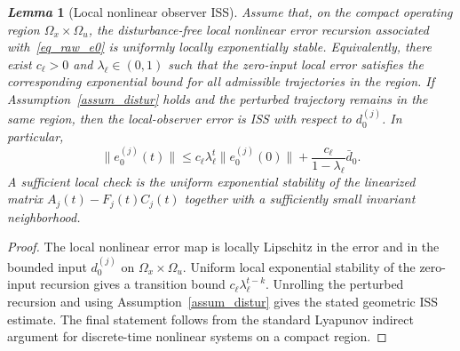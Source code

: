 \documentclass[journal,twoside]{IEEEtran}
\newtheorem{lemma}{\it Lemma}%
\begin{document}
\begin{lemma}[Local nonlinear observer ISS]\label{lem_local_iss}
Assume that, on the compact operating region $\Omega_x\times\Omega_u$, the disturbance-free local nonlinear error recursion associated with~\eqref{eq_raw_e0} is uniformly locally exponentially stable. Equivalently, there exist $c_{\ell}>0$ and $\lambda_{\ell}\in(0,1)$ such that the zero-input local error satisfies the corresponding exponential bound for all admissible trajectories in the region. If Assumption~\ref{assum_distur} holds and the perturbed trajectory remains in the same region, then the local-observer error is ISS with respect to $d_0^{(j)}$. In particular,
\begin{equation}
\|e_0^{(j)}(t)\|\le c_{\ell}\lambda_{\ell}^{t}\|e_0^{(j)}(0)\|
+\frac{c_{\ell}}{1-\lambda_{\ell}}\bar d_0 .
\end{equation}
A sufficient local check is the uniform exponential stability of the linearized matrix $A_j(t)-F_j(t)C_j(t)$ together with a sufficiently small invariant neighborhood.
\end{lemma}
\begin{proof}
The local nonlinear error map is locally Lipschitz in the error and in the bounded input $d_0^{(j)}$ on $\Omega_x\times\Omega_u$. Uniform local exponential stability of the zero-input recursion gives a transition bound $c_{\ell}\lambda_{\ell}^{t-k}$. Unrolling the perturbed recursion and using Assumption~\ref{assum_distur} gives the stated geometric ISS estimate. The final statement follows from the standard Lyapunov indirect argument for discrete-time nonlinear systems on a compact region.
\end{proof}
\end{document}
